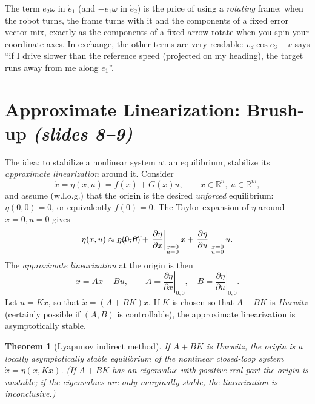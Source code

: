 \documentclass[11pt,a4paper]{article}
\def\bm#1{#1}%
\def\vect#1{#1}%
\newcommand{\R}{\mathbb{R}}
\newcommand{\vect}[1]{\bm{#1}}
\newcommand{\vd}{v_d}
\theoremstyle{definition}
\theoremstyle{plain}
\newtheorem{theorem}[definition]{Theorem}
\theoremstyle{remark}
\begin{document}
\begin{intuition}
The term $e_2\omega$ in $\dot e_1$ (and $-e_1\omega$ in $\dot e_2$) is the price of using a \emph{rotating} frame: when the robot turns, the frame turns with it and the components of a fixed error vector mix, exactly as the components of a fixed arrow rotate when you spin your coordinate axes. In exchange, the other terms are very readable: $\vd\cos e_3-v$ says ``if I drive slower than the reference speed (projected on my heading), the target runs away from me along $e_1$''.
\end{intuition}

\section{Approximate Linearization: Brush-up \texorpdfstring{\emph{(slides 8--9)}}{(slides 8--9)}}

The idea: to stabilize a nonlinear system at an equilibrium, stabilize its \emph{approximate linearization} around it. Consider
\[
\dot{\vect x}=\vect\eta(\vect x,\vect u)=\vect f(\vect x)+\vect G(\vect x)\vect u,\qquad \vect x\in\R^n,\ \vect u\in\R^m,
\]
and assume (w.l.o.g.) that the origin is the desired \emph{unforced} equilibrium: $\vect\eta(\vect 0,\vect 0)=\vect 0$, or equivalently $\vect f(\vect 0)=\vect 0$. The Taylor expansion of $\vect\eta$ around $\vect x=\vect 0,\vect u=\vect 0$ gives
\[
\vect\eta(\vect x,\vect u)\approx\cancel{\vect\eta(\vect 0,\vect 0)}+\left.\frac{\partial\vect\eta}{\partial\vect x}\right|_{\substack{\vect x=\vect 0\\ \vect u=\vect 0}}\vect x+\left.\frac{\partial\vect\eta}{\partial\vect u}\right|_{\substack{\vect x=\vect 0\\ \vect u=\vect 0}}\vect u .
\]
The \emph{approximate linearization} at the origin is then
\[
\dot{\vect x}=\vect A\vect x+\vect B\vect u,\qquad \vect A=\left.\frac{\partial\vect\eta}{\partial\vect x}\right|_{\vect 0,\vect 0},\quad \vect B=\left.\frac{\partial\vect\eta}{\partial\vect u}\right|_{\vect 0,\vect 0}.
\]
Let $\vect u=\vect K\vect x$, so that $\dot{\vect x}=(\vect A+\vect B\vect K)\vect x$. If $\vect K$ is chosen so that $\vect A+\vect B\vect K$ is \emph{Hurwitz} (certainly possible if $(\vect A,\vect B)$ is controllable), the approximate linearization is asymptotically stable.

\begin{theorem}[Lyapunov indirect method]\label{thm:indirect}
If $\vect A+\vect B\vect K$ is Hurwitz, the origin is a \emph{locally} asymptotically stable equilibrium of the nonlinear closed-loop system $\dot{\vect x}=\vect\eta(\vect x,\vect K\vect x)$. (If $\vect A+\vect B\vect K$ has an eigenvalue with positive real part the origin is unstable; if the eigenvalues are only marginally stable, the linearization is inconclusive.)
\end{theorem}
\end{document}
